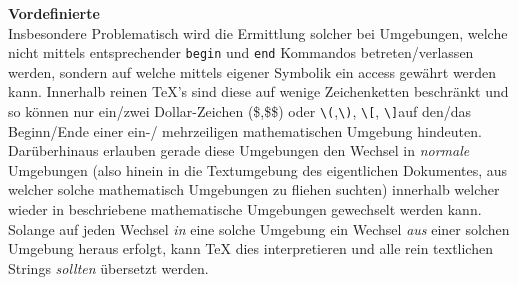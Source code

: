 \textbf{Vordefinierte}\\
\noindent Insbesondere Problematisch wird die Ermittlung solcher bei Umgebungen, welche nicht mittels entsprechender \texttt{begin} und \texttt{end} Kommandos betreten/verlassen werden, sondern auf welche mittels eigener Symbolik ein access gewährt werden kann. Innerhalb reinen \TeX{}'s sind diese auf wenige Zeichenketten beschränkt und so können nur ein/zwei Dollar-Zeichen (\$,\$\$) oder \verb|\(|,\verb|\)|, \verb|\[|, \verb|\]|auf den/das Beginn/Ende einer ein-/ mehrzeiligen mathematischen Umgebung hindeuten. Darüberhinaus erlauben gerade diese Umgebungen den Wechsel in \textit{normale} Umgebungen (also hinein in die Textumgebung des eigentlichen Dokumentes, aus welcher solche mathematisch Umgebungen zu fliehen suchten) innerhalb welcher wieder in beschriebene mathematische Umgebungen gewechselt werden kann. Solange auf jeden Wechsel \textit{in} eine solche Umgebung ein Wechsel \textit{aus} einer solchen Umgebung heraus erfolgt, kann \TeX{} dies interpretieren und alle rein textlichen Strings \textit{sollten} übersetzt werden.

